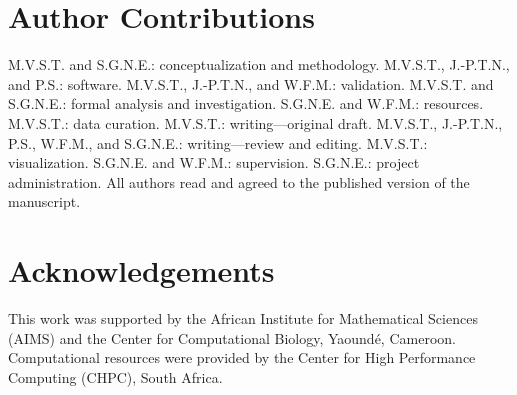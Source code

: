 \documentclass[jcim,article,layout=manuscript]{achemso}
\begin{document}
\section*{Author Contributions}
\begin{sloppypar}
M.V.S.T. and S.G.N.E.: conceptualization and methodology. M.V.S.T., J.-P.T.N., and P.S.: software. M.V.S.T., J.-P.T.N., and W.F.M.: validation. M.V.S.T. and S.G.N.E.: formal analysis and investigation. S.G.N.E. and W.F.M.: resources. M.V.S.T.: data curation. M.V.S.T.: writing---original draft. M.V.S.T., J.-P.T.N., P.S., W.F.M., and S.G.N.E.: writing---review and editing. M.V.S.T.: visualization. S.G.N.E. and W.F.M.: supervision. S.G.N.E.: project administration. All authors read and agreed to the published version of the manuscript.
\end{sloppypar}

\section*{Acknowledgements}

This work was supported by the African Institute for Mathematical Sciences
(AIMS) and the Center for Computational Biology, Yaound\'{e}, Cameroon.
Computational resources were provided by the Center for High Performance
Computing (CHPC), South Africa.


\end{document}
